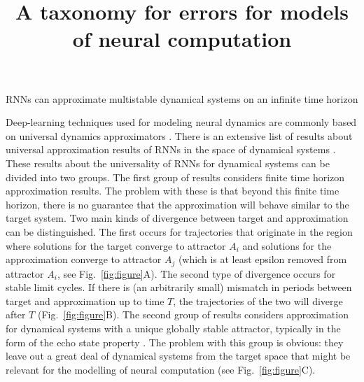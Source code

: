 \documentclass[10pt]{article}
\begin{document}

\title{A taxonomy for errors for models of neural computation}

\begin{center}
\Large{RNNs can approximate multistable dynamical systems on an infinite time horizon}
\end{center}

\noindent
Deep-learning techniques used for modeling neural dynamics are commonly based on universal dynamics approximators \citep{durstewitz2023reconstructing}.
There is an extensive list of results about universal approximation results of RNNs in the space of dynamical systems \citep{li2022approximation,jiang2023brief}.
These results about the universality of RNNs for dynamical systems can be divided into two groups.
 The first group of results considers finite time horizon approximation results.
  The problem with these is that beyond this finite time horizon, there is no guarantee that the approximation will behave similar to the target system.
   Two main kinds of divergence between target and approximation can be distinguished.
   The first occurs for trajectories that originate in the region where solutions for the target converge to attractor $A_i$ and solutions for the approximation converge to attractor $A_j$ (which is at least epsilon removed from attractor $A_i$, see Fig.~\ref{fig:figure}A). 
   The second type of divergence occurs for stable limit cycles. If there is (an arbitrarily small) mismatch in periods between target and approximation up to time $T$, the trajectories of the two will diverge after $T$ (Fig.~\ref{fig:figure}B).
  The second group of results considers approximation for dynamical systems with a unique globally stable attractor, typically in the form of the echo state property \citep{jaeger2001echo}.
   The problem with this group is obvious: they leave out a great deal of dynamical systems from the target space that might be relevant for the modelling of neural computation \citep{wong2006timeintegration,mante2013context} (see Fig.~\ref{fig:figure}C).
\end{document}
